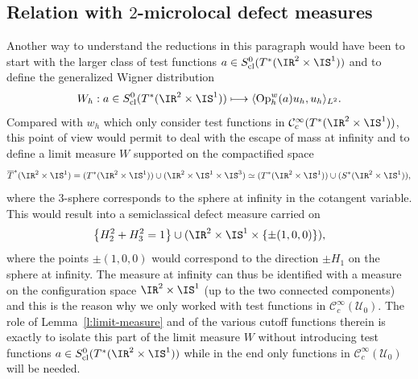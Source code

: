 \documentclass[JEP,XML,SOM,Unicode, NoEqCountersInSection,published]{cedram}
\newcommand\mto{\mathchoice{\longmapsto}{\mapsto}{\mapsto}{\mapsto}}
\theoremstyle{plain}
\theoremstyle{definition}
\theoremstyle{remark}
\newcommand{\Op}{\operatorname{Op}}
\begin{document}
\subsection{Relation with $2$-microlocal defect measures}\label{ss:2microlocal}
Another way to understand the reductions in this paragraph would have been to start with the larger class of test functions $a\in S^0_{\textup{cl}}(T^*(\IR^2\times \IS^1))$ and to define the generalized Wigner distribution
\[
W_h: a\in S^0_{\textup{cl}}(T^*(\IR^2\times \IS^1))\mto \langle \Op_h^w(a)u_h,u_h\rangle_{L^2}.
\]
Compared with $w_h$ which only consider test functions in $\mathcal{C}^{\infty}_c(T^*(\IR^2\times \IS^1))$, this point of view would permit to deal with the escape of mass at infinity and to define a limit measure $W$ supported on the compactified space
\[
\overline{T}^*(\IR^2\times \IS^1)=(T^*(\IR^2\times \IS^1))\cup(\IR^2\times \IS^1\times\IS^3)\simeq (T^*(\IR^2\times \IS^1))\cup(S^*(\IR^2\times \IS^1)),
\]
where the $3$-sphere corresponds to the sphere at infinity in the cotangent variable. This would result into a semiclassical defect measure carried on
\[
\left\{H_2^2+H_3^2=1\right\}\cup (\IR^2\times\IS^1\times \{\pm (1,0,0)\}),
\]
where the points $\pm (1,0,0)$ would correspond to the direction $\pm H_1$ on the sphere at infinity. The measure at infinity can thus be identified with a measure on the configuration space $\IR^2\times\IS^1$ (up to the two connected components) and this is the reason why we only worked with test functions in $\mathcal{C}^{\infty}_c(\mathcal{U}_0)$. The role of Lemma~\ref{l:limit-measure} and of the various cutoff functions therein is exactly to isolate this part of the limit measure $W$ without introducing test functions $a\in S^0_{\textup{cl}}(T^*(\IR^2\times \IS^1))$ while in the end only functions in $\mathcal{C}^{\infty}_c(\mathcal{U}_0)$ will be needed.
\end{document}
